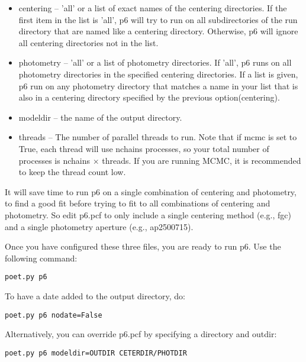 \documentclass[letterpaper,12pt]{article}
\begin{document}
\begin{itemize}
\item centering -- 'all' or a list of exact names of the centering
  directories. If the first item in the list is 'all', p6 will try to
  run on all subdirectories of the run directory that are named like a
  centering directory. Otherwise, p6 will ignore all centering
  directories not in the list.

\item photometry -- 'all' or a list of photometry directories. If
  'all', p6 runs on all photometry directories in the specified
  centering directories. If a list is given, p6 run on any photometry
  directory that matches a name in your list that is also in a
  centering directory specified by the previous option(centering).

\item modeldir -- the name of the output directory.

\item threads -- The number of parallel threads to run. Note that if
  mcmc is set to True, each thread will use nchains processes, so your
  total number of processes is nchains $\times$ threads.  If you are
  running MCMC, it is recommended to keep the thread count low.
\end{itemize}

It will save time to run p6 on a single combination of centering and
photometry, to find a good fit before trying to fit to all
combinations of centering and photometry. So edit p6.pcf to only
include a single centering method (e.g., fgc) and a single photometry
aperture (e.g., ap2500715).

Once you have configured these three files, you are ready to run p6. Use
the following command:

\begin{verbatim}
poet.py p6
\end{verbatim}

To have a date added to the output directory, do:

\begin{verbatim}
poet.py p6 nodate=False
\end{verbatim}

Alternatively, you can override p6.pcf by specifying a directory and outdir:

\begin{verbatim}
poet.py p6 modeldir=OUTDIR CETERDIR/PHOTDIR
\end{verbatim}
\end{document}
